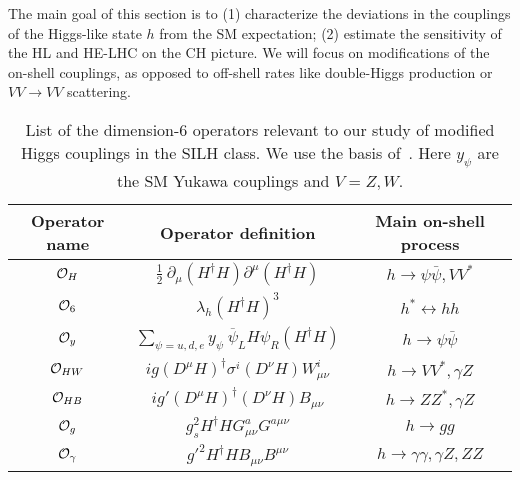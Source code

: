 The main goal of this section is to (1) characterize the deviations in the couplings of the Higgs-like state $h$ from the SM expectation; (2) estimate the sensitivity of the HL and HE-LHC on the CH picture. We will focus on modifications of the on-shell couplings, as opposed to off-shell rates like double-Higgs production or $VV\to VV$ scattering. 









\begin{table}[t]
\caption{\small List of the dimension-6 operators relevant to our study of modified Higgs couplings in the SILH class. We use the basis of~\cite{Giudice:2007fh}. Here $y_\psi$ are the SM Yukawa couplings and $V=Z,W$. %
\label{tab1}}
\begin{center}
{
\begin{tabular}{c|c|c} 
\rule{0pt}{1.2em}%
Operator name & Operator definition & Main on-shell process \\
\hline
${\cal O}_H$ & $\frac{1}{2}~\partial_\mu(H^\dagger H)\partial^\mu(H^\dagger H)$ & $h\to\psi\bar\psi, VV^*$     \\
${\cal O}_6$ & $\lambda_h(H^\dagger H)^3$ & $h^*\leftrightarrow hh$   \\
${\cal O}_y$ & $\sum_{\psi=u,d,e} y_\psi~\overline\psi_L H\psi_R(H^\dagger H)$ & $h\to\psi\bar\psi$   \\
\hline
%
${\cal O}_{HW}$ & $ig(D^\mu H)^\dagger\sigma^i(D^\nu H)W_{\mu\nu}^i$ & $h\to VV^*,\gamma Z$   \\
${\cal O}_{HB}$ & $ig'(D^\mu H)^\dagger(D^\nu H)B_{\mu\nu}$ & $h\to ZZ^*,\gamma Z$  \\
\hline
${\cal O}_{g}$ & $g_s^2H^\dagger H G^a_{\mu\nu}G^{a\mu\nu}$ & $h\to gg$   \\
${\cal O}_{\gamma}$ & $g'^2H^\dagger HB_{\mu\nu}B^{\mu\nu}$ & $h\to \gamma\gamma,\gamma Z,ZZ$  
%
\end{tabular}
}
\end{center}
\end{table}





